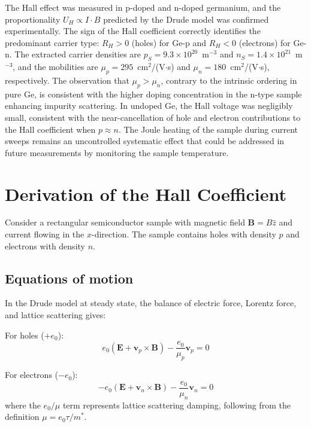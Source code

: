 \documentclass[%
 reprint,
 amsmath,amssymb,
 aps,
]{revtex4-2}
\begin{document}
The Hall effect was measured in p-doped and n-doped germanium, and the proportionality $U_H \propto I \cdot B$ predicted by the Drude model was confirmed experimentally. The sign of the Hall coefficient correctly identifies the predominant carrier type: $R_H > 0$ (holes) for Ge-p and $R_H < 0$ (electrons) for Ge-n. The extracted carrier densities are $p_S = 9.3 \times 10^{20}$~m$^{-3}$ and $n_S = 1.4 \times 10^{21}$~m$^{-3}$, and the mobilities are $\mu_p = 295$~cm$^2$/(V$\cdot$s) and $\mu_n = 180$~cm$^2$/(V$\cdot$s), respectively. The observation that $\mu_p > \mu_n$, contrary to the intrinsic ordering in pure Ge, is consistent with the higher doping concentration in the n-type sample enhancing impurity scattering. In undoped Ge, the Hall voltage was negligibly small, consistent with the near-cancellation of hole and electron contributions to the Hall coefficient when $p \approx n$. The Joule heating of the sample during current sweeps remains an uncontrolled systematic effect that could be addressed in future measurements by monitoring the sample temperature.




\appendix

\section{\label{app:hall-derivation}Derivation of the Hall Coefficient}

Consider a rectangular semiconductor sample with magnetic field $\mathbf{B} = B\hat{z}$ and current flowing in the $x$-direction. The sample contains holes with density $p$ and electrons with density $n$.

\subsection{Equations of motion}

In the Drude model at steady state, the balance of electric force, Lorentz force, and lattice scattering gives:

For holes ($+e_0$):
\begin{equation}
  e_0(\mathbf{E} + \mathbf{v}_p \times \mathbf{B}) - \frac{e_0}{\mu_p}\mathbf{v}_p = 0
\end{equation}

For electrons ($-e_0$):
\begin{equation}
  -e_0(\mathbf{E} + \mathbf{v}_n \times \mathbf{B}) - \frac{e_0}{\mu_n}\mathbf{v}_n = 0
\end{equation}
where the $e_0/\mu$ term represents lattice scattering damping, following from the definition $\mu = e_0 \tau / m^*$.
\end{document}
